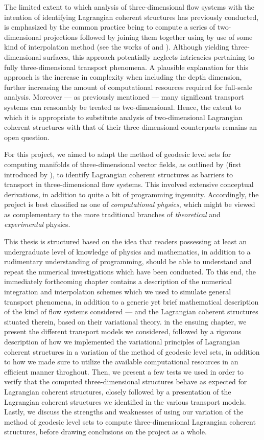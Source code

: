 The limited extent to which analysis of three-dimensional flow systems with the
intention of identifying Lagrangian coherent structures has previously
conducted, is emphasized by the common practice being to compute a series of
two-dimensional projections followed by joining them together using by use of
some kind of interpolation method (see the works of
\textcite{blazevski2014hyperbolic} and \textcite{oettinger2016autonomous}).
Although yielding three-dimensional surfaces, this approach potentially
neglects intricacies pertaining to fully three-dimensional transport phenomena.
A plausible explanation for this approach is the increase in complexity when
including the depth dimension, further increasing the amount of computational
resources required for full-scale analysis. Moreover --- as previously
mentioned --- many significant transport systems can reasonably be treated as
two-dimensional. Hence, the extent to which it is appropriate to substitute
analysis of two-dimensional Lagrangian coherent structures with that of their
three-dimensional counterparts remains an open question.

For this project, we aimed to adapt the method of geodesic level sets for
computing manifolds of three-dimensional vector fields, as outlined by
\textcite{krauskopf2005survey} (first introduced by
\textcite{krauskopf2003computing}), to identify Lagrangian coherent structures
as barriers to transport in three-dimensional flow systems. This involved
extensive conceptual derivations, in addition to quite a bit of programming
ingenuity. Accordingly, the project is best classified as one of
\emph{computational physics}, which might be viewed as complementary to the
more traditional branches of \emph{theoretical} and \emph{experimental}
physics.

This thesis is structured based on the idea that readers possessing
at least an undergraduate level of knowledge of physics and mathematics, in
addition to a rudimentary understanding of programming, should be able to
understand and repeat the numerical investigations which have been conducted.
To this end, the immediately forthcoming chapter contains a description of the
numerical integration and interpolation schemes which we used to simulate
general transport phenomena, in addition to a generic yet brief mathematical
description of the kind of flow systems considered --- and the Lagrangian
coherent structures situated therein, based on their variational theory. in the
ensuing chapter, we present the different transport models we considered,
followed by a rigorous description of how we implemented the variational
principles of Lagrangian coherent structures in a variation of the method of
geodesic level sets, in addition to how we made sure to utilize the available
computational resources in an efficient manner throghout. Then, we present a
few tests we used in order to verify that the computed three-dimensional
structures behave as expected for Lagrangian coherent structures, closely
followed by a presentation of the Lagrangian coherent structures we identified
in the various transport models. Lastly, we discuss the strengths and
weaknesses of using our variation of the method of geodesic level sets to
compute three-dimensional Lagrangian coherent structures, before drawing
conclusions on the project as a whole.

